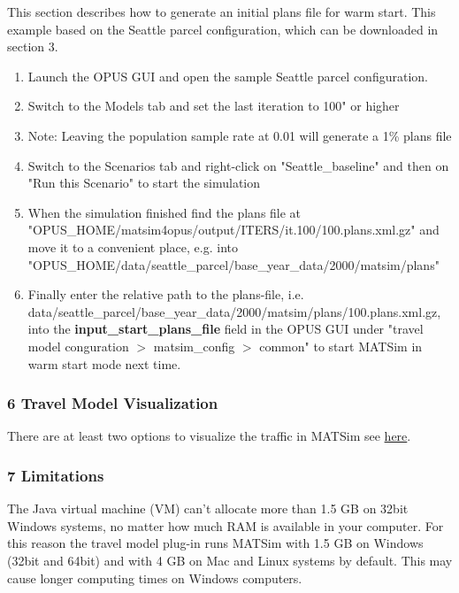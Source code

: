 This section describes how to generate an initial plans file for warm  start. This example based on the Seattle parcel configuration, which  can be downloaded in section 3.
\begin{enumerate}
	\item Launch the OPUS GUI and open the sample Seattle parcel configuration.
	\item Switch to the Models tab and set the last iteration to 100" or higher
	\item Note: Leaving the population sample rate at 0.01 will generate a 1\% plans file
	\item Switch to the Scenarios tab and right-click on "Seattle\_baseline" and then on "Run this Scenario" to start the simulation
	\item When the simulation finished find the plans file at  "OPUS\_HOME/matsim4opus/output/ITERS/it.100/100.plans.xml.gz" and move it  to a convenient place, e.g. into  "OPUS\_HOME/data/seattle\_parcel/base\_year\_data/2000/matsim/plans"
	\item Finally enter the relative path to the plans-file, i.e.  data/seattle\_parcel/base\_year\_data/2000/matsim/plans/100.plans.xml.gz,  into the \textbf{input\_start\_plans\_file }field in the OPUS GUI  under "travel model conguration $>$ matsim\_config $>$ common" to start  MATSim in warm start mode next time.
\end{enumerate}

\subsubsection{6 Travel Model Visualization}

There are at least two options to visualize the traffic in MATSim see \href{http://matsim.org/node/741}{here}.

\subsubsection{7 Limitations}

The Java virtual machine (VM) can't allocate more than 1.5 GB on  32bit Windows systems, no matter how much RAM is available in your  computer. For this reason the travel model plug-in runs MATSim with 1.5  GB on Windows (32bit and 64bit) and with 4 GB on Mac and Linux systems  by default. This may cause longer computing times on Windows  computers.


